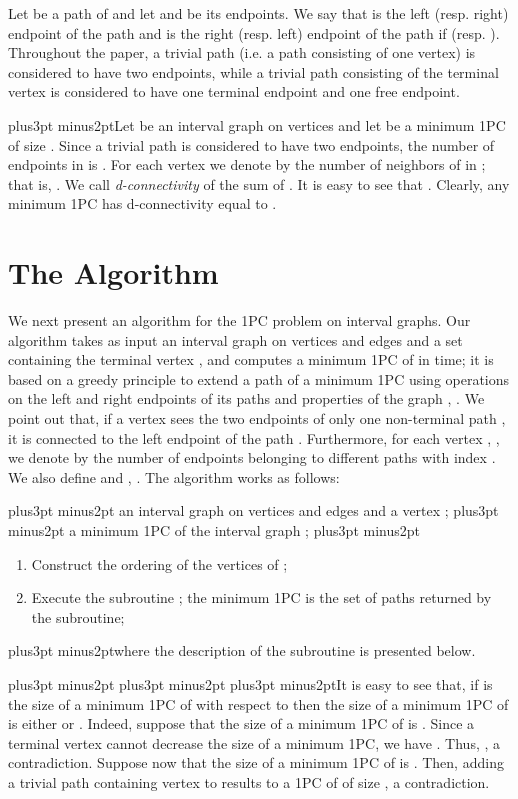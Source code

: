 \documentclass[10pt]{article}
\def\yskip{\penalty-50\vskip3pt plus3pt minus2pt}
\def\y{\yskip}
\def\yyy{\yskip\yskip\yskip}
\begin{document}
Let  be a path of  and let 
and  be its endpoints. We say that  is the left (resp.
right) endpoint of the path and  is the right (resp. left)
endpoint of the path if  (resp. ).
Throughout the paper, a trivial path (i.e. a path consisting of
one vertex) is considered to have two endpoints, while a trivial
path consisting of the terminal vertex  is
considered to have one terminal endpoint and one free endpoint.

\y Let  be an interval graph on  vertices and let
 be a minimum 1PC of size
. Since a trivial path is considered to have
two endpoints, the number of endpoints in
 is . For each
vertex  we denote by  the number of neighbors of
 in ; that is, . We call {\it d-connectivity} of
 the sum of . It is easy to see that . Clearly, any minimum 1PC
 has d-connectivity equal to
.

\vskip 0.3in \section{The Algorithm}

We next present an algorithm for the 1PC problem on interval
graphs. Our algorithm takes as input an interval graph  on 
vertices and  edges and a set  containing
the terminal vertex , and computes a minimum 1PC of
 in  time; it is based on a greedy principle to extend
a path of a minimum 1PC using operations on the left and right
endpoints of its paths and properties of the graph , . We point out that, if a
vertex sees the two endpoints of only one non-terminal path ,
it is connected to the left endpoint of the path . Furthermore,
for each vertex , , we denote by
 the number of endpoints  belonging
to different paths with index . We also define
 and
, . The algorithm works as follows:


\bigskip {} \y {} an interval graph  on  vertices and  edges and a
vertex ; \y {} a minimum 1PC
 of the interval graph ; \y

\begin{enumerate}
  \item Construct the ordering  of the vertices of ;
  \item Execute the subroutine ; the minimum
  1PC  is the set
  of paths returned by the subroutine;
\end{enumerate}

\y \noindent where the description of the subroutine
 is presented below.

\yyy It is easy to see that, if  is the
size of a minimum 1PC of  with respect to 
then the size of a minimum 1PC of  is either
 or . Indeed,
suppose that the size of a minimum 1PC of  is
. Since a terminal vertex cannot
decrease the size of a minimum 1PC, we have
.
Thus, , a
contradiction. Suppose now that the size of a minimum 1PC
 of  is
. Then, adding a trivial path containing
vertex  to  results to
a 1PC of  of size , a contradiction.
\end{document}
